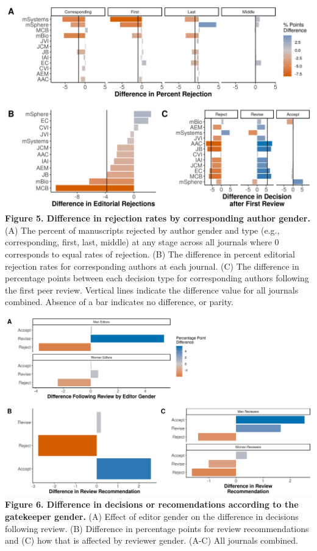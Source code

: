 \documentclass[11pt,]{article}
\begin{document}
\includegraphics{Figure_4.png} \textbf{Figure 5. Difference in rejection
rates by corresponding author gender.} (A) The percent of manuscripts
rejected by author gender and type (e.g., corresponding, first, last,
middle) at any stage across all journals where 0 corresponds to equal
rates of rejection. (B) The difference in percent editorial rejection
rates for corresponding authors at each journal. (C) The difference in
percentage points between each decision type for corresponding authors
following the first peer review. Vertical lines indicate the difference
value for all journals combined. Absence of a bar indicates no
difference, or parity.

\newpage

\includegraphics{Figure_5.png} \textbf{Figure 6. Difference in decisions
or recomendations according to the gatekeeper gender.} (A) Effect of
editor gender on the difference in decisions following review. (B)
Difference in percentage points for review recommendations and (C) how
that is affected by reviewer gender. (A-C) All journals combined.
\end{document}

